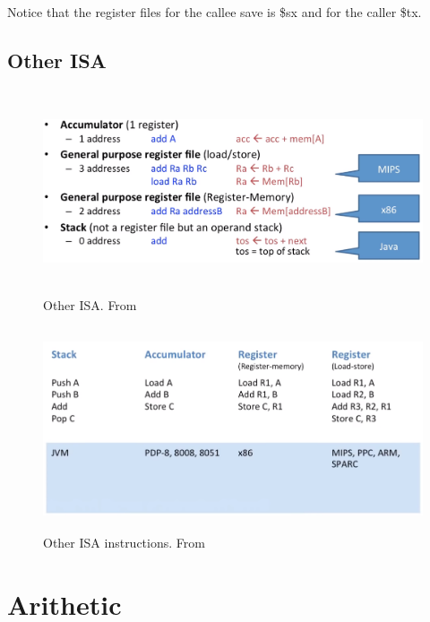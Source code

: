 Notice that the register files for the callee save is \$sx and for the caller \$tx.

\newpage
\subsection{Other ISA}
\begin{figure}[h]
    \vspace{10mm}
    \centering
    \includegraphics[width=16cm, height=6cm]{image/other-isa.png} 
    \caption{Other ISA. From \cite{}}
\end{figure}

\newpage

\begin{figure}[h]
    \vspace{10mm}
    \centering
    \includegraphics[width=16cm, height=6cm]{image/other-isa-instructions.png} 
    \caption{Other ISA instructions. From \cite{}}
\end{figure}


\newpage


\section{Arithetic}

